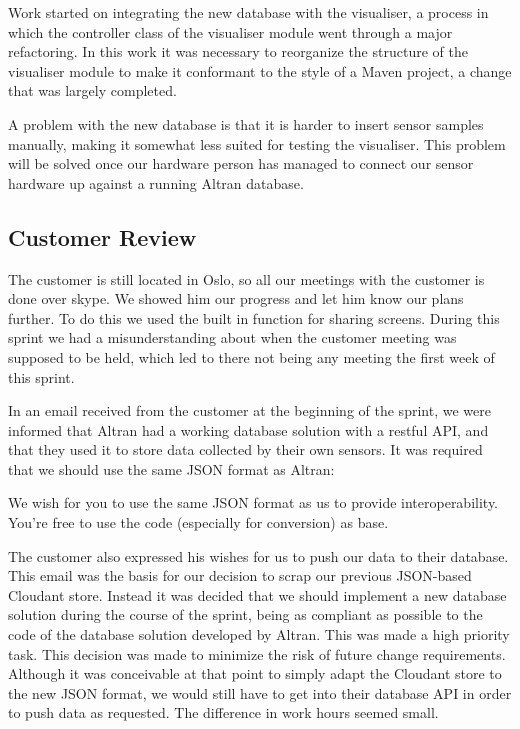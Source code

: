 \documentclass[../document]{subfiles}
\begin{document}
Work started on integrating the new database with the visualiser, a process in which the controller class of the visualiser module went through a major refactoring. In this work it was necessary to reorganize the structure of the visualiser module to make it conformant to the style of a Maven project, a change that was largely completed.

A problem with the new database is that it is harder to insert sensor samples manually, making it somewhat less suited for testing the visualiser. This problem will be solved once our hardware person has managed to connect our sensor hardware up against a running \gls{Altran} database.

\subsection{Customer Review}
The customer is still located in Oslo, so all our meetings with the customer is done over skype. We showed him our progress and let him know our plans further. To do this we used the built in function for sharing screens. During this sprint we had a misunderstanding about when the customer meeting was supposed to be held, which led to there not being any meeting the first week of this sprint.

In an email received from the customer at the beginning of the sprint, we were informed that \gls{Altran} had a working database solution with a restful \gls{API}, and that they used it to store data collected by their own sensors. It was required that we should use the same \gls{JSON} format as \gls{Altran}:

\begin{italicquotation}
We wish for you to use the same \gls{JSON} format as us to provide interoperability. You’re free to use the code (especially for conversion) as base.
\end{italicquotation}

The customer also expressed his wishes for us to push our data to their database. This email was the basis for our decision to scrap our previous \gls{JSON}-based \gls{Cloudant} store. Instead it was decided that we should implement a new database solution during the course of the sprint, being as compliant as possible to the code of the database solution developed by \gls{Altran}. This was made a high priority task. This decision was made to minimize the risk of future change requirements. Although it was conceivable at that point to simply adapt the \gls{Cloudant} store to the new \gls{JSON} format, we would still have to get into their database \gls{API} in order to push data as requested. The difference in work hours seemed small.
\end{document}
